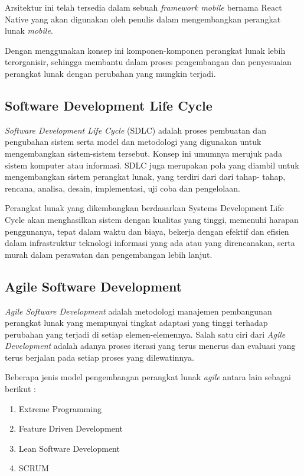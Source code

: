 \begin{spacing}{2}
    Arsitektur ini telah tersedia dalam sebuah \emph{framework mobile} bernama React Native yang akan digunakan oleh penulis dalam mengembangkan perangkat lunak \emph{mobile}.

    Dengan menggunakan konsep ini komponen-komponen perangkat lunak lebih terorganisir, sehingga membantu dalam proses pengembangan dan penyesuaian perangkat lunak dengan perubahan yang mungkin terjadi.

  \subsection{Software Development Life Cycle}
    \emph{Software Development Life Cycle} (SDLC) adalah proses pembuatan dan pengubahan sistem serta model dan metodologi yang digunakan untuk mengembangkan sistem-sistem tersebut. Konsep ini umumnya merujuk pada sistem komputer atau informasi. SDLC juga merupakan pola yang diambil untuk mengembangkan sistem perangkat lunak, yang terdiri dari dari tahap- tahap, rencana, analisa, desain, implementasi, uji coba dan pengelolaan.

    Perangkat lunak yang dikembangkan berdasarkan Systems Development Life Cycle akan menghasilkan sistem dengan kualitas yang tinggi, memenuhi harapan penggunanya, tepat dalam waktu dan biaya, bekerja dengan efektif dan efisien dalam infrastruktur teknologi informasi yang ada atau yang direncanakan, serta murah dalam perawatan dan pengembangan lebih lanjut.

  \subsection{Agile Software Development}
    \emph{Agile Software Development} adalah metodologi manajemen pembangunan perangkat lunak yang mempunyai tingkat adaptasi yang tinggi terhadap perubahan yang terjadi di setiap elemen-elemennya. Salah satu ciri dari \emph{Agile Development} adalah adanya proses iterasi yang terus menerus dan evaluasi yang terus berjalan pada setiap proses yang dilewatinnya.

    Beberapa jenis model pengembangan perangkat lunak \emph{agile} antara lain sebagai berikut :
    \begin{enumerate}
      \item Extreme Programming
      \item Feature Driven Development
      \item Lean Software Development
      \item SCRUM
    \end{enumerate}


\end{spacing}
